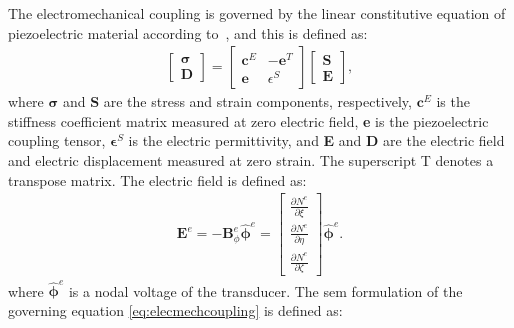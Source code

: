 \documentclass[11pt,a4paper,final]{report}
\begin{document}
The electromechanical coupling is governed by the linear constitutive equation of piezoelectric material according to~\cite{giurgiutiu2009micromechatronics, rekatsinas2017cubic}, and this is defined as:
\begin{eqnarray}
	\left [ 
	\begin {array}{c}
	\boldsymbol{\sigma}\\
	\textbf{D}
\end{array}\right ]=
\left [ 
\begin{array}{cc}
	\textbf{c}^E & -\textbf{e}^T \\
	\textbf{e} & \epsilon^S 
\end{array} \right ]
\left[ 
\begin{array}{c}
	\textbf{S}\\
	\textbf{E} 
\end{array} \right ],
\label{eq:elecmechcoupling}
\end{eqnarray}
where \(\boldsymbol{\sigma}\) and \(\textbf{S}\) are the stress and strain components, respectively, \(\textbf{c}^E\) is the stiffness coefficient matrix measured at zero electric field, \textbf{e} is the piezoelectric coupling tensor,  \(\boldsymbol{\epsilon}^S\) is the electric permittivity, and \textbf{E} and \textbf{D} are the electric field and electric displacement measured at zero strain.
The superscript T denotes a transpose matrix.
The electric field is defined as:
\begin{eqnarray}
\textbf{E}^e=-\textbf{B}_\phi^e \widehat{\boldsymbol{\phi}}^e = \left[ \begin{array}{c}
	\frac{\partial N^e}{\partial \xi}\\
	\frac{\partial N^e}{\partial \eta}\\
	\frac{\partial N^e}{\partial \zeta}
\end{array} \right] \widehat{\boldsymbol{\phi}}^e.
\end{eqnarray}
where \(\widehat{\boldsymbol{\phi}}^e\) is a nodal voltage of the transducer. The \ac{sem} formulation of the governing equation \ref{eq:elecmechcoupling} is defined as:
\end{document}
